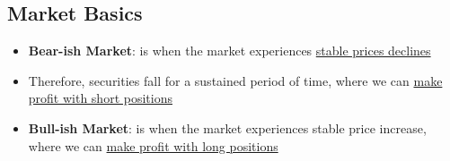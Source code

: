 \documentclass{article}
\begin{document}
\subsection{Market Basics}
\begin{itemize}
\item \textbf{Bear-ish Market}: is when the market experiences \underline{stable prices declines}
\item Therefore, securities fall for a sustained period of time, where we can \underline{make profit with short positions}
\item \textbf{Bull-ish Market}: is when the market experiences stable price increase, where we can  \underline{make profit with long positions}
\end{itemize}
\end{document}
